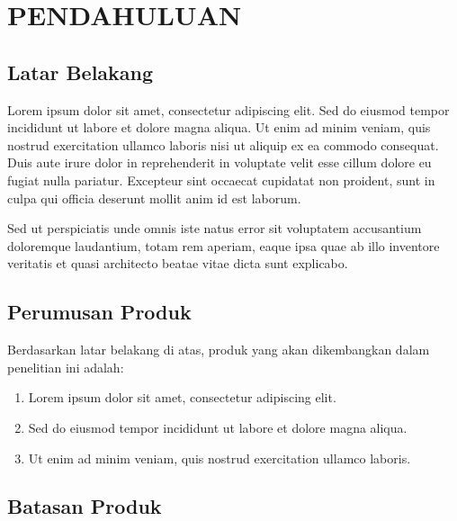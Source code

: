 \chapter{PENDAHULUAN}

\section{Latar Belakang}


Lorem ipsum dolor sit amet, consectetur adipiscing elit. Sed do eiusmod tempor incididunt ut labore et dolore magna aliqua. Ut enim ad minim veniam, quis nostrud exercitation ullamco laboris nisi ut aliquip ex ea commodo consequat. Duis aute irure dolor in reprehenderit in voluptate velit esse cillum dolore eu fugiat nulla pariatur. Excepteur sint occaecat cupidatat non proident, sunt in culpa qui officia deserunt mollit anim id est laborum.

Sed ut perspiciatis unde omnis iste natus error sit voluptatem accusantium doloremque laudantium, totam rem aperiam, eaque ipsa quae ab illo inventore veritatis et quasi architecto beatae vitae dicta sunt explicabo.

\section{Perumusan Produk}


Berdasarkan latar belakang di atas, produk yang akan dikembangkan dalam penelitian ini adalah:

\begin{enumerate}
  \item Lorem ipsum dolor sit amet, consectetur adipiscing elit.
  \item Sed do eiusmod tempor incididunt ut labore et dolore magna aliqua.
  \item Ut enim ad minim veniam, quis nostrud exercitation ullamco laboris.
\end{enumerate}

\section{Batasan Produk}

